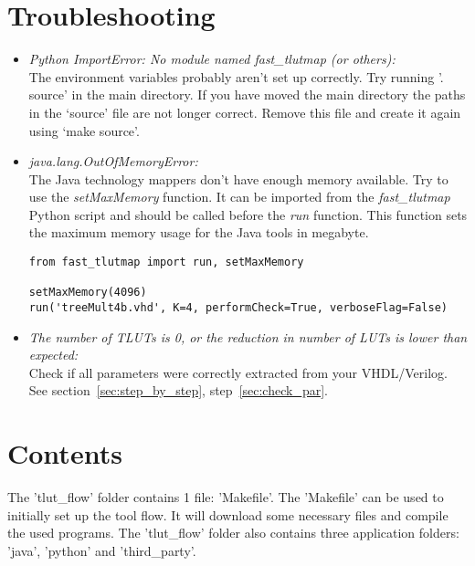 \documentclass[a4paper]{memoir}
\begin{document}
\chapter{Troubleshooting}\label{sec:troubleshooting}
\begin{itemize}
\item \emph{Python ImportError: No module named fast\_tlutmap (or others):}\\
The environment variables probably aren't set up correctly. Try running '. source' in the main directory. 
If you have moved the main directory the paths in the `source' file are not longer correct. Remove this file and create it again using `make source'.

\item \emph{java.lang.OutOfMemoryError:}\\
The Java technology mappers don't have enough memory available. Try to use the \emph{setMaxMemory} function. It can be imported from the \emph{fast\_tlutmap} Python script and should be called before the \emph{run} function. This function sets the maximum memory usage for the Java tools in megabyte.
\lstset{language=python}
\begin{lstlisting}
from fast_tlutmap import run, setMaxMemory

setMaxMemory(4096)
run('treeMult4b.vhd', K=4, performCheck=True, verboseFlag=False)
\end{lstlisting}

\item \emph{The number of TLUTs is 0, or the reduction in number of LUTs is lower than expected:}\\
Check if all parameters were correctly extracted from your VHDL/Verilog. See section~\ref{sec:step_by_step}, step~\ref{sec:check_par}.
\end{itemize}


\chapter{Contents}\label{sec:contents}
The 'tlut\_flow' folder contains 1 file: 'Makefile'. The 'Makefile' can be used to initially set up the tool flow. It will download some necessary files and compile the used programs.
The 'tlut\_flow' folder also contains three application folders: 'java', 'python' and 'third\_party'.
\end{document}
